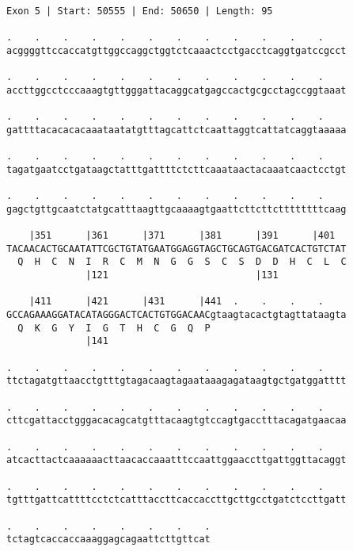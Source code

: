 \documentclass{article}
\begin{document}
\begin{Verbatim}[fontfamily=courier]
Exon 5 | Start: 50555 | End: 50650 | Length: 95

.    .    .    .    .    .    .    .    .    .    .    .    
acggggttccaccatgttggccaggctggtctcaaactcctgacctcaggtgatccgcct

.    .    .    .    .    .    .    .    .    .    .    .    
accttggcctcccaaagtgttgggattacaggcatgagccactgcgcctagccggtaaat

.    .    .    .    .    .    .    .    .    .    .    .    
gattttacacacacaaataatatgtttagcattctcaattaggtcattatcaggtaaaaa

.    .    .    .    .    .    .    .    .    .    .    .    
tagatgaatcctgataagctatttgattttctcttcaaataactacaaatcaactcctgt

.    .    .    .    .    .    .    .    .    .    .    .    
gagctgttgcaatctatgcatttaagttgcaaaagtgaattcttcttcttttttttcaag

    |351      |361      |371      |381      |391      |401  
TACAACACTGCAATATTCGCTGTATGAATGGAGGTAGCTGCAGTGACGATCACTGTCTAT
  Q  H  C  N  I  R  C  M  N  G  G  S  C  S  D  D  H  C  L  C
              |121                          |131            

    |411      |421      |431      |441  .    .    .    .    
GCCAGAAAGGATACATAGGGACTCACTGTGGACAACgtaagtacactgtagttataagta
  Q  K  G  Y  I  G  T  H  C  G  Q  P                        
              |141                                          

.    .    .    .    .    .    .    .    .    .    .    .    
ttctagatgttaacctgtttgtagacaagtagaataaagagataagtgctgatggatttt

.    .    .    .    .    .    .    .    .    .    .    .    
cttcgattacctgggacacagcatgtttacaagtgtccagtgacctttacagatgaacaa

.    .    .    .    .    .    .    .    .    .    .    .    
atcacttactcaaaaaacttaacaccaaatttccaattggaaccttgattggttacaggt

.    .    .    .    .    .    .    .    .    .    .    .    
tgtttgattcattttcctctcatttaccttcaccaccttgcttgcctgatctccttgatt

.    .    .    .    .    .    .    .
tctagtcaccaccaaaggagcagaattcttgttcat
\end{Verbatim}
\newpage
\end{document}
